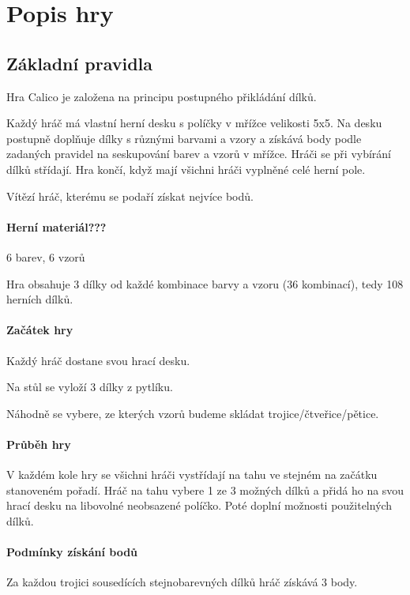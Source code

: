 
\chapter{Popis hry}

\section{Základní pravidla}

Hra Calico je založena na principu postupného přikládání dílků. 

Každý hráč má vlastní herní desku s políčky v mřížce velikosti 5x5. Na desku postupně doplňuje dílky s různými barvami a vzory a získává body podle zadaných pravidel na seskupování barev a vzorů v mřížce. Hráči se při vybírání dílků střídají. Hra končí, když mají všichni hráči vyplněné celé herní pole.

Vítězí hráč, kterému se podaří získat nejvíce bodů.

\subsubsection*{Herní materiál???}
6 barev, 6 vzorů

Hra obsahuje 3 dílky od každé kombinace barvy a vzoru (36 kombinací), tedy 108 herních dílků.
\subsubsection*{Začátek hry}
Každý hráč dostane svou hrací desku.

Na stůl se vyloží 3 dílky z pytlíku. 

Náhodně se vybere, ze kterých vzorů budeme skládat trojice/čtveřice/pětice.
\subsubsection*{Průběh hry}

V každém kole hry se všichni hráči vystřídají na tahu ve stejném na začátku stanoveném pořadí. Hráč na tahu vybere 1 ze 3 možných dílků a přidá ho na svou hrací desku na libovolné neobsazené políčko. Poté doplní možnosti použitelných dílků.

\subsubsection*{Podmínky získání bodů}
Za každou trojici sousedících stejnobarevných dílků hráč získává 3 body.

